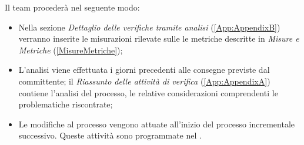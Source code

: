 Il team procederà nel seguente modo: 
\begin{itemize}
\item Nella sezione \textit{Dettaglio delle verifiche tramite analisi} (\ref{App:AppendixB})  verranno inserite le misurazioni rilevate sulle le metriche descritte in \textit{Misure e Metriche} (\ref{MisureMetriche});
\item L'analisi viene effettuata i giorni precedenti alle consegne previste dal committente; il \textit{Riassunto delle attività di verifica} (\ref{App:AppendixA}) contiene l'analisi del processo, le relative considerazioni  comprendenti le problematiche riscontrate;
\item Le modifiche al processo vengono attuate all'inizio del processo incrementale successivo. Queste attività sono programmate nel \PianoDiProgetto.
\end{itemize}
